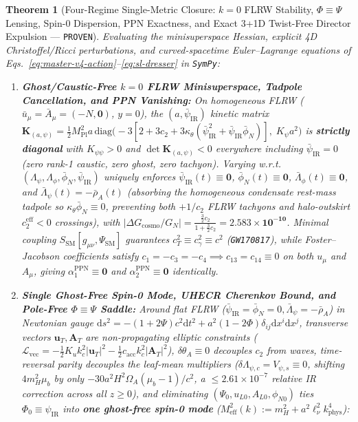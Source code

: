 \documentclass[11pt,a4paper]{article}
\newtheorem{theorem}{Theorem}
\begin{document}
\begin{theorem}[Four-Regime Single-Metric Closure: $k = 0$ FLRW Stability, $\Phi \equiv \Psi$ Lensing, Spin-0 Dispersion, PPN Exactness, and Exact 3+1D Twist-Free Director Expulsion --- \textnormal{{\upshape\texttt{PROVEN}}}]
\label{thm:covariant-helmholtz}
Evaluating the minisuperspace Hessian, explicit 4D Christoffel/Ricci perturbations, and curved-spacetime Euler--Lagrange equations of Eqs.~\eqref{eq:master-v4-action}--\eqref{eq:sl-dresser} in \texttt{SymPy}:
\begin{enumerate}
  \item \textbf{Ghost/Caustic-Free $k = 0$ FLRW Minisuperspace, Tadpole Cancellation, and PPN Vanishing:} On homogeneous FLRW ($\bar{u}_\mu = \bar{A}_\mu = (-N, \mathbf{0})$, $y = 0$), the $(a,\bar{\psi}_{\mathrm{IR}})$ kinetic matrix $\mathbf{K}_{(a,\psi)} = \frac{1}{2}M_{\mathrm{Pl}}^2 a\,\mathrm{diag}\bigl(-3[2 + 3c_2 + 3\kappa_\theta(\bar{\psi}_{\mathrm{IR}}^2 + \bar{\psi}_{\mathrm{IR}}\bar{\phi}_N)],\; K_\psi a^2\bigr)$ is \textbf{strictly diagonal} with $K_{\psi\psi} > 0$ and $\det\mathbf{K}_{(a,\psi)} < 0$ everywhere including $\bar{\psi}_{\mathrm{IR}} = 0$ (zero rank-1 caustic, zero ghost, zero tachyon). Varying w.r.t.\ $(\Lambda_\psi, \Lambda_\phi, \bar{\phi}_N, \bar{\psi}_{\mathrm{IR}})$ uniquely enforces $\bar{\psi}_{\mathrm{IR}}(t) \equiv \mathbf{0}$, $\bar{\phi}_N(t) \equiv \mathbf{0}$, $\bar{\Lambda}_\phi(t) \equiv \mathbf{0}$, and $\bar{\Lambda}_\psi(t) = -\bar{\rho}_A(t)$ (absorbing the homogeneous condensate rest-mass tadpole so $\kappa_\theta\bar{\phi}_N \equiv 0$, preventing both $+1/c_2$ FLRW tachyons and halo-outskirt $c_2^{\mathrm{eff}} < 0$ crossings), with $|\Delta G_{\mathrm{cosmo}}/G_N| = \frac{\frac{3}{2}c_2}{1 + \frac{3}{2}c_2} = \mathbf{2.583\times 10^{-10}}$. Minimal coupling $S_{\mathrm{SM}}[g_{\mu\nu},\Psi_{\mathrm{SM}}]$ guarantees $c_T^2 \equiv c_\gamma^2 \equiv c^2$ (\texttt{GW170817}), while Foster--Jacobson coefficients \cite{JacobsonMattingly2001,FosterJacobson2006,OostMukohyamaWang2018} satisfy $c_1 = -c_3 = -c_4 \implies c_{13} = c_{14} \equiv 0$ on \emph{both} $u_\mu$ and $A_\mu$, giving $\alpha_1^{\mathrm{PPN}} \equiv \mathbf{0}$ and $\alpha_2^{\mathrm{PPN}} \equiv \mathbf{0}$ identically.
  \item \textbf{Single Ghost-Free Spin-0 Mode, UHECR Cherenkov Bound, and Pole-Free $\Phi \equiv \Psi$ Saddle:} Around flat FLRW ($\bar{\psi}_{\mathrm{IR}} = \bar{\phi}_N = 0, \bar{\Lambda}_\psi = -\bar{\rho}_A$) in Newtonian gauge $\mathrm{d}s^2 = -(1 + 2\Psi)c^2\mathrm{d}t^2 + a^2(1 - 2\Phi)\delta_{ij}\mathrm{d}x^i\mathrm{d}x^j$, transverse vectors $\mathbf{u}_T, \mathbf{A}_T$ are non-propagating elliptic constraints ($\mathcal{L}_{\mathrm{vec}} = -\frac{1}{2}K_u k_c^2|\mathbf{u}_T|^2 - \frac{1}{2}c_{\mathrm{acc}}k_c^2|\mathbf{A}_T|^2$), $\delta\theta_A \equiv 0$ decouples $c_2$ from waves, time-reversal parity decouples the leaf-mean multipliers ($\delta\Lambda_{\psi,c} = V_{\psi,s} \equiv 0$, shifting $4m_H^2\mu_b$ by only $-30a^2 H^2\Omega_A(\mu_b-1)/c^2$, a $\le 2.61\times 10^{-7}$ relative IR correction across all $z \ge 0$), and eliminating $(\Psi_0, u_{L0}, A_{L0}, \phi_{N0})$ ties $\Phi_0 \equiv \psi_{\mathrm{IR}}$ into \textbf{one ghost-free spin-0 mode} ($M_{\mathrm{eff}}^2(k) := m_H^2 + a^2\ell_\nu^2 k_{\mathrm{phys}}^4$):

\end{enumerate}
\end{theorem}
\end{document}

